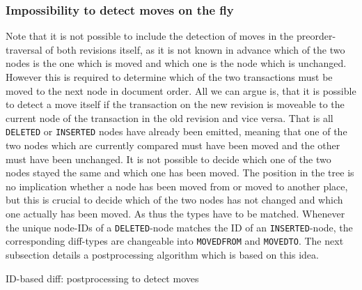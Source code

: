 \subsubsection{Impossibility to detect moves on the fly} Note that it is not possible to include the detection of moves in the preorder-traversal of both revisions itself, as it is not known in advance which of the two nodes is the one which is moved and which one is the node which is unchanged. However this is required to determine which of the two transactions must be moved to the next node in document order. All we can argue is, that it is possible to detect a move itself if the transaction on the new revision is moveable to the current node of the transaction in the old revision and vice versa. That is all \texttt{DELETED} or \texttt{INSERTED} nodes have already been emitted, meaning that one of the two nodes which are currently compared must have been moved and the other must have been unchanged. It is not possible to decide which one of the two nodes stayed the same and which one has been moved. The position in the tree is no implication whether a node has been moved from or moved to another place, but this is crucial to decide which of the two nodes has not changed and which one actually has been moved. As thus the types have to be matched. Whenever the unique node-IDs of a \texttt{DELETED}-node matches the ID of an \texttt{INSERTED}-node, the corresponding diff-types are changeable into \texttt{MOVEDFROM} and \texttt{MOVEDTO}. The next subsection details a postprocessing algorithm which is based on this idea.

\begin{algorithm}[tb]
\BlankLine
{}
\caption{ID-based diff: postprocessing to detect moves}\label{diffPostprocessing}
\end{algorithm}

